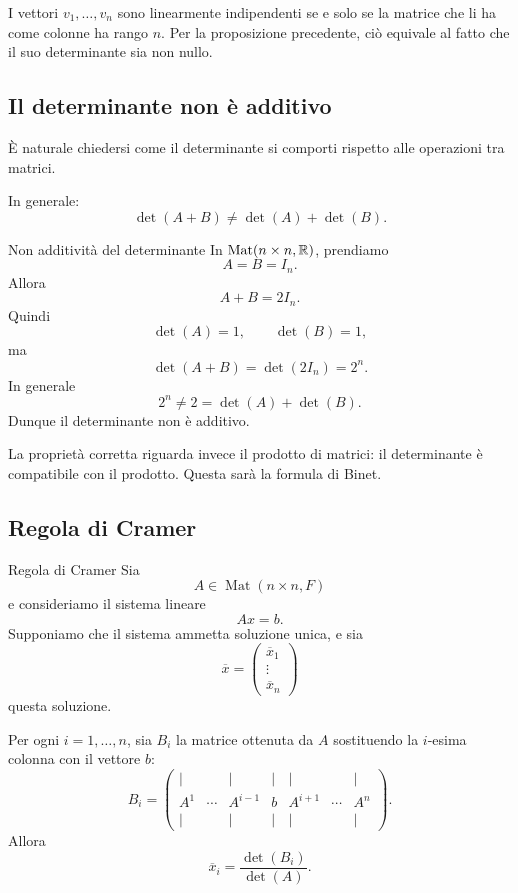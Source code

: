 \documentclass[a4paper]{article}
\begin{document}
\begin{snippetproof}{}
    I vettori \(v_1,\ldots,v_n\) sono linearmente indipendenti se e solo se la matrice che li ha come colonne ha rango \(n\). Per la proposizione precedente, ciò equivale al fatto che il suo determinante sia non nullo.
\end{snippetproof}

\subsection{Il determinante non è additivo}

È naturale chiedersi come il determinante si comporti rispetto alle operazioni tra matrici.

In generale:
\[
    \det(A+B)\neq \det(A)+\det(B).
\]

\begin{snippetexample}{Non additività del determinante}
    In \(\operatorname{Mat}(n\times n,\mathbb{R})\), prendiamo
    \[
        A=B=I_n.
    \]
    Allora
    \[
        A+B=2I_n.
    \]
    Quindi
    \[
        \det(A)=1,
        \qquad
        \det(B)=1,
    \]
    ma
    \[
        \det(A+B)=\det(2I_n)=2^n.
    \]
    In generale
    \[
        2^n\neq 2=\det(A)+\det(B).
    \]
    Dunque il determinante non è additivo.
\end{snippetexample}

La proprietà corretta riguarda invece il prodotto di matrici: il determinante è compatibile con il prodotto. Questa sarà la formula di Binet.

\subsection{Regola di Cramer}

\begin{snippettheorem}{Regola di Cramer}
    Sia
    \[
        A\in\operatorname{Mat}(n\times n,F)
    \]
    e consideriamo il sistema lineare
    \[
        Ax=b.
    \]
    Supponiamo che il sistema ammetta soluzione unica, e sia
    \[
        \overline{x}=
        \begin{pmatrix}
            \overline{x}_1\\
            \vdots\\
            \overline{x}_n
        \end{pmatrix}
    \]
    questa soluzione.

    Per ogni \(i=1,\ldots,n\), sia \(B_i\) la matrice ottenuta da \(A\) sostituendo la \(i\)-esima colonna con il vettore \(b\):
    \[
        B_i=
        \begin{pmatrix}
            \vert & & \vert & \vert & \vert & & \vert\\
            A^1 & \cdots & A^{i-1} & b & A^{i+1} & \cdots & A^n\\
            \vert & & \vert & \vert & \vert & & \vert
        \end{pmatrix}.
    \]
    Allora
    \[
        \overline{x}_i=\frac{\det(B_i)}{\det(A)}.
    \]
\end{snippettheorem}
\end{document}
